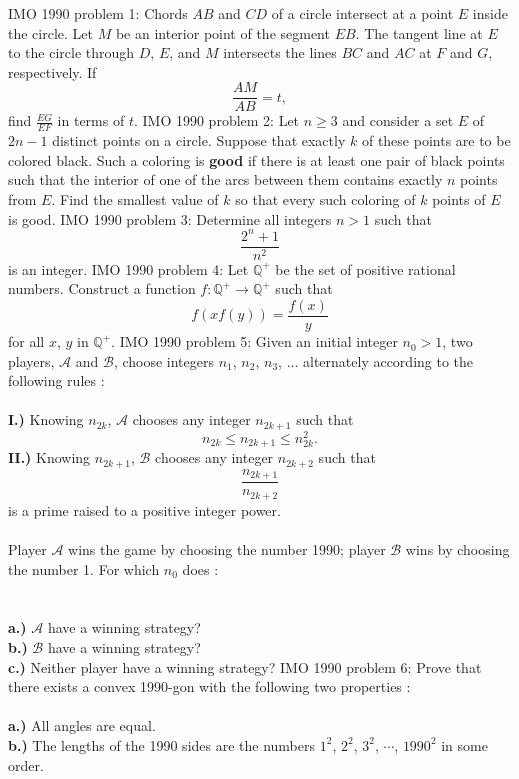 IMO 1990 problem 1:  Chords $ AB$ and $ CD$ of a circle intersect at a point $ E$ inside the circle.  Let $ M$ be an interior point of the segment $ EB$.  The tangent line at $ E$ to the circle through $ D$, $ E$, and $ M$ intersects the lines $ BC$ and $ AC$ at $ F$ and $ G$, respectively.  If
\[ \frac {AM}{AB} = t, \]
find $\frac {EG}{EF}$ in terms of $ t$. 
IMO 1990 problem 2:  Let $ n \geq 3$ and consider a set $ E$ of $ 2n - 1$ distinct points on a circle. Suppose that exactly $ k$ of these points are to be colored black.  Such a coloring is \textbf{good} if there is at least one pair of black points such that the interior of one of the arcs between them contains exactly $ n$ points from $ E$.  Find the smallest value of $ k$ so that every such coloring of $ k$ points of $ E$ is good. 
IMO 1990 problem 3:  Determine all integers $ n > 1$ such that
\[ \frac {2^n + 1}{n^2} \]
is an integer. 
IMO 1990 problem 4:  Let $ {\mathbb Q}^ +$ be the set of positive rational numbers. Construct a function $ f : {\mathbb Q}^ + \rightarrow {\mathbb Q}^ +$ such that
\[ f(xf(y)) = \frac {f(x)}{y} \]
for all $ x$, $ y$ in $ {\mathbb Q}^ +$. 
IMO 1990 problem 5:  Given an initial integer $ n_0 > 1$, two players, $ {\mathcal A}$ and $ {\mathcal B}$, choose integers $ n_1$, $ n_2$, $ n_3$, $ \ldots$ alternately according to the following rules : \\\\
\textbf{I.)} Knowing $ n_{2k}$, $ {\mathcal A}$ chooses any integer $ n_{2k + 1}$ such that
\[ n_{2k} \leq n_{2k + 1} \leq n_{2k}^2. \]
\textbf{II.)} Knowing $ n_{2k + 1}$, $ {\mathcal B}$ chooses any integer $ n_{2k + 2}$ such that
\[ \frac {n_{2k + 1}}{n_{2k + 2}} \]
is a prime raised to a positive integer power. \\\\
Player $ {\mathcal A}$ wins the game by choosing the number 1990; player $ {\mathcal B}$ wins by choosing the number 1.  For which $ n_0$ does : \\\\\\
\textbf{a.)} $ {\mathcal A}$ have a winning strategy? \\
\textbf{b.)} $ {\mathcal B}$ have a winning strategy? \\
\textbf{c.)} Neither player have a winning strategy? 
IMO 1990 problem 6:  Prove that there exists a convex 1990-gon with the following two properties : \\\\
\textbf{a.)} All angles are equal. \\
\textbf{b.)} The lengths of the 1990 sides are the numbers $ 1^2$, $ 2^2$, $ 3^2$, $ \cdots$, $ 1990^2$ in some order. 

